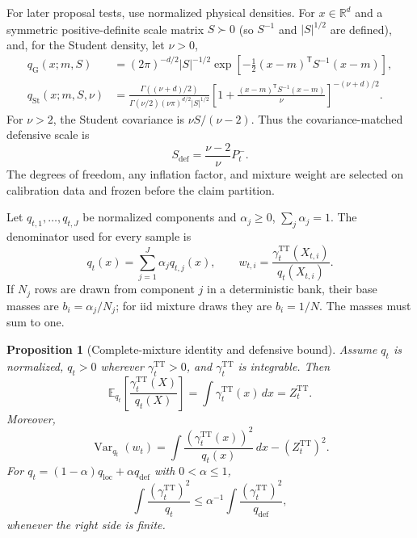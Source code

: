 \documentclass[11pt]{article}
\newtheorem{proposition}{Proposition}
\begin{document}
For later proposal tests, use normalized physical densities. For $x\in
\mathbb R^d$ and a symmetric positive-definite scale matrix $S\succ0$
(so $S^{-1}$ and $|S|^{1/2}$ are defined),
and, for the Student density, let $\nu>0$,
\begin{align}
 q_{\mathrm G}(x;m,S)
 &= (2\pi)^{-d/2}|S|^{-1/2}
    \exp\left[-\tfrac12(x-m)^\mathsf TS^{-1}(x-m)\right],
 \label{eq:coherent-gaussian-density}\\
 q_{\mathrm{St}}(x;m,S,\nu)
 &=\frac{\Gamma((\nu+d)/2)}
   {\Gamma(\nu/2)(\nu\pi)^{d/2}|S|^{1/2}}
   \left[1+\frac{(x-m)^\mathsf TS^{-1}(x-m)}{\nu}\right]^{-(\nu+d)/2}.
 \label{eq:coherent-student-density}
\end{align}
For $\nu>2$, the Student covariance is $\nu S/(\nu-2)$. Thus the
covariance-matched defensive scale is
\begin{equation}\label{eq:coherent-student-scale}
  S_{\mathrm{def}}=\frac{\nu-2}{\nu}P_t^-.
\end{equation}
The degrees of freedom, any inflation factor, and mixture weight are selected
on calibration data and frozen before the claim partition.

Let $q_{t,1},\ldots,q_{t,J}$ be normalized components and
$\alpha_j\geq0$, $\sum_j\alpha_j=1$. The denominator used for every sample is
\begin{equation}\label{eq:coherent-mixture-density}
  q_t(x)=\sum_{j=1}^J\alpha_jq_{t,j}(x),
  \qquad
  w_{t,i}=\frac{\gamma_t^{\mathrm{TT}}(X_{t,i})}{q_t(X_{t,i})}.
\end{equation}
If $N_j$ rows are drawn from component $j$ in a deterministic bank, their base
masses are $b_i=\alpha_j/N_j$; for iid mixture draws they are $b_i=1/N$.
The masses must sum to one.

\begin{proposition}[Complete-mixture identity and defensive bound]
\label{prop:coherent-dmis}
Assume $q_t$ is normalized, $q_t>0$ wherever
$\gamma_t^{\mathrm{TT}}>0$, and $\gamma_t^{\mathrm{TT}}$ is integrable. Then
\begin{equation}\label{eq:coherent-dmis-identity}
  \mathbb E_{q_t}\left[\frac{\gamma_t^{\mathrm{TT}}(X)}{q_t(X)}\right]
  =\int\gamma_t^{\mathrm{TT}}(x)\,dx=Z_t^{\mathrm{TT}}.
\end{equation}
Moreover,
\begin{equation}\label{eq:coherent-dmis-variance}
  \operatorname{Var}_{q_t}(w_t)
  =\int\frac{(\gamma_t^{\mathrm{TT}}(x))^2}{q_t(x)}\,dx
    -(Z_t^{\mathrm{TT}})^2.
\end{equation}
For $q_t=(1-\alpha)q_{\mathrm{loc}}+\alpha q_{\mathrm{def}}$ with
$0<\alpha\leq1$,
\begin{equation}\label{eq:coherent-defensive-bound}
  \int\frac{(\gamma_t^{\mathrm{TT}})^2}{q_t}
  \leq\alpha^{-1}\int\frac{(\gamma_t^{\mathrm{TT}})^2}{q_{\mathrm{def}}},
\end{equation}
whenever the right side is finite.
\end{proposition}
\end{document}
